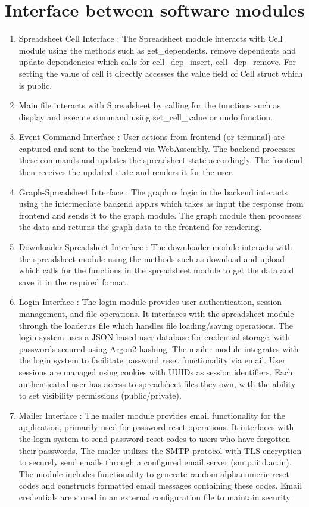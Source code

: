 \documentclass[10pt,a4paper]{article}  %
\begin{document}
\section{Interface between software modules}
\begin{enumerate}
    \item Spreadsheet Cell Interface : The Spreadsheet module interacts with Cell module using the methods such as get\_dependents, remove dependents and update dependencies which calls for cell\_dep\_insert, cell\_dep\_remove. For setting the value of cell it directly accesses the value field of Cell struct which is public.
    \item Main file interacts with Spreadsheet by calling for the functions such as display and execute command using set\_cell\_value or undo function.
    \item Event-Command Interface : User actions from frontend (or terminal) are captured and sent to the backend via WebAssembly. The backend processes these commands and updates the spreadsheet state accordingly. The frontend then receives the updated state and renders it for the user.
    \item Graph-Spreadsheet Interface : The graph.rs logic in the backend interacts using the intermediate backend app.rs which takes as input the response from frontend and sends it to the graph module. The graph module then processes the data and returns the graph data to the frontend for rendering.
    \item Downloader-Spreadsheet Interface : The downloader module interacts with the spreadsheet module using the methods such as download and upload which calls for the functions in the spreadsheet module to get the data and save it in the required format.
    \item Login Interface : The login module provides user authentication, session management, and file operations. It interfaces with the spreadsheet module through the loader.rs file which handles file loading/saving operations. The login system uses a JSON-based user database for credential storage, with passwords secured using Argon2 hashing. The mailer module integrates with the login system to facilitate password reset functionality via email. User sessions are managed using cookies with UUIDs as session identifiers. Each authenticated user has access to spreadsheet files they own, with the ability to set visibility permissions (public/private).
    \item Mailer Interface : The mailer module provides email functionality for the application, primarily used for password reset operations. It interfaces with the login system to send password reset codes to users who have forgotten their passwords. The mailer utilizes the SMTP protocol with TLS encryption to securely send emails through a configured email server (smtp.iitd.ac.in). The module includes functionality to generate random alphanumeric reset codes and constructs formatted email messages containing these codes. Email credentials are stored in an external configuration file to maintain security.

\end{enumerate}
\end{document}
